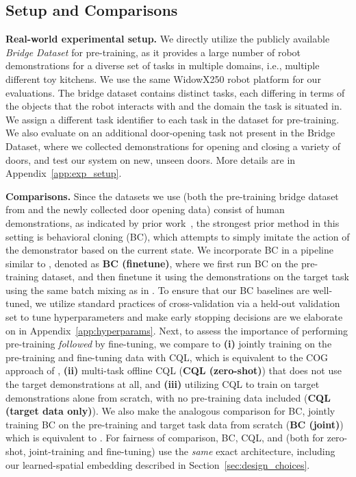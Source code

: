 \vspace{0.1cm}
\subsection{Setup and Comparisons}
\vspace{0.1cm}

\textbf{Real-world experimental setup.} We directly utilize the publicly available \emph{Bridge Dataset}
\cite{ebert2021bridge} for pre-training, as it provides a large number of robot demonstrations for a diverse set of tasks in multiple domains, i.e., multiple different toy kitchens. We use the same WidowX250 robot platform for our evaluations. The bridge dataset contains distinct tasks, each differing in terms of the objects that the robot interacts with and the domain the task is situated in. We assign a different task identifier to each task in the dataset for pre-training. We also evaluate on an additional door-opening task not present in the Bridge Dataset, where we collected demonstrations for opening and closing a variety of doors, and test our system on new, unseen doors. {More details are in Appendix~\ref{app:exp_setup}.} 



\textbf{Comparisons.} Since the datasets we use (both the pre-training bridge dataset from \citep{ebert2021bridge} and the newly collected door opening data) consist of human demonstrations, as indicated by prior work~\citep{mandlekar2021what}, the strongest prior method in this setting is behavioral cloning (BC), which attempts to simply imitate the action of the demonstrator based on the current state. We incorporate BC in a pipeline similar to \ptrmethodname, denoted as \textbf{BC (finetune)}, where we first run BC on the pre-training dataset, and then finetune it using the demonstrations on the target task using the same batch mixing as in \ptrmethodname. 
To ensure that our BC baselines are well-tuned, we utilize standard practices of cross-validation via a held-out validation set to tune hyperparameters and make early stopping decisions are we elaborate on in {Appendix~\ref{app:hyperparams}}.
Next, to assess the importance of performing pre-training \emph{followed} by fine-tuning, we compare \ptrmethodname to \textbf{(i)} jointly training on the pre-training and fine-tuning data with CQL, which is equivalent to the COG approach of \citet{singh2020cog},
\textbf{(ii)} multi-task offline CQL (\textbf{CQL (zero-shot)}) that does not use the target demonstrations at all, and \textbf{(iii)} utilizing CQL to train on target demonstrations alone from scratch, with no pre-training data included (\textbf{CQL (target data only)}).
We also make the analogous comparison for BC, jointly training BC on the pre-training and target task data from scratch (\textbf{BC (joint)}) which is equivalent to \citep{ebert2021bridge}. For fairness of comparison, BC, CQL, and \ptrmethodname (both for zero-shot, joint-training and fine-tuning) use the \emph{same} exact architecture, including our learned-spatial embedding described in Section~\ref{sec:design_choices}.


